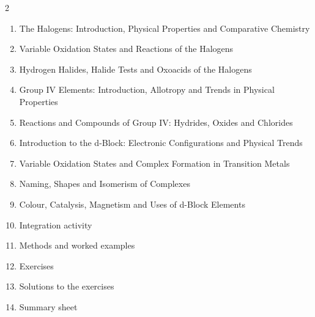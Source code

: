 \documentclass[11pt]{article}
\begin{document}
\begin{sommaire}
\begin{multicols}{2}
\begin{enumerate}
\item The Halogens: Introduction, Physical Properties and Comparative Chemistry
\item Variable Oxidation States and Reactions of the Halogens
\item Hydrogen Halides, Halide Tests and Oxoacids of the Halogens
\item Group IV Elements: Introduction, Allotropy and Trends in Physical Properties
\item Reactions and Compounds of Group IV: Hydrides, Oxides and Chlorides
\item Introduction to the d-Block: Electronic Configurations and Physical Trends
\item Variable Oxidation States and Complex Formation in Transition Metals
\item Naming, Shapes and Isomerism of Complexes
\item Colour, Catalysis, Magnetism and Uses of d-Block Elements
\item Integration activity
\item Methods and worked examples
\item Exercises
\item Solutions to the exercises
\item Summary sheet
\end{enumerate}
\end{multicols}
\end{sommaire}
\end{document}
